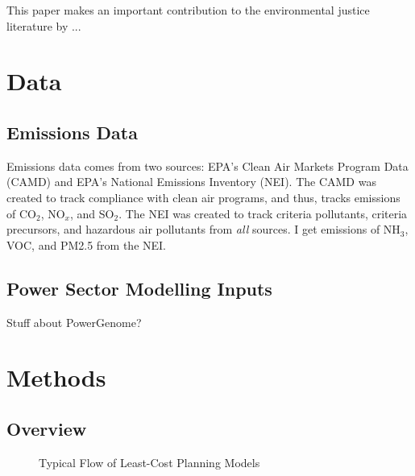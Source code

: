 \documentclass[a4paper]{article}
\theoremstyle{definition}
\theoremstyle{plain}
\begin{document}
This paper makes an important contribution to the environmental justice literature by ...


\section{Data}
\subsection{Emissions Data}
Emissions data comes from two sources: EPA's Clean Air Markets Program Data (CAMD) and EPA's National Emissions Inventory (NEI).  The CAMD was created to track compliance with clean air programs, and thus, tracks emissions of CO$_2$, NO$_x$, and SO$_2$.  The NEI was created to track criteria pollutants, criteria precursors, and hazardous air pollutants from \textit{all} sources.  I get emissions of NH$_3$, VOC, and PM2.5 from the NEI. 

\subsection{Power Sector Modelling Inputs}
Stuff about PowerGenome?

\section{Methods}
\subsection{Overview}

\begin{figure}
    \begin{center}
    \end{center}
    \caption{Typical Flow of Least-Cost Planning Models}
    \label{fig:enter-label}
\end{figure}
\end{document}

